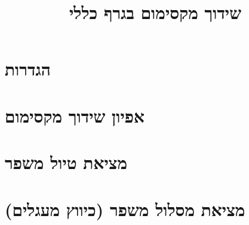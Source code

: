 \documentclass[]{article}
\title{שידוך מקסימום בגרף כללי}
\author{}
\date{}
\begin{document}
\maketitle

\section{הגדרות}

\section{אפיון שידוך מקסימום}

\section{מציאת טיול משפר}

\section{
מציאת מסלול משפר (כיווץ מעגלים) 
}

\end{document}
